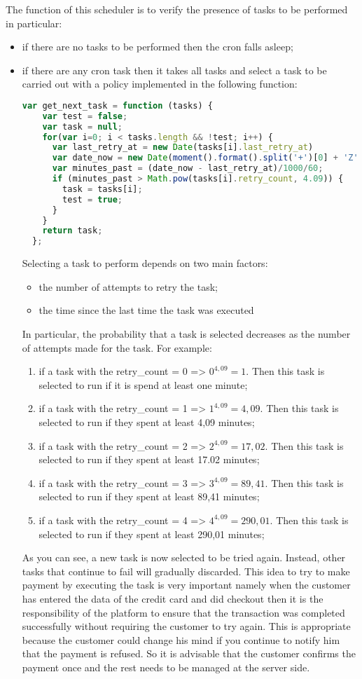 The function of this scheduler is to verify the presence of tasks to be performed in particular:
\begin{itemize}
\item if there are no tasks to be performed then the cron falls asleep;
\item if there are any cron task then it takes all tasks and select a task to be carried out with a policy implemented in the following function:
\begin{lstlisting}[language=javascript]
  var get_next_task = function (tasks) {
    var test = false;
    var task = null;
    for(var i=0; i < tasks.length && !test; i++) {
      var last_retry_at = new Date(tasks[i].last_retry_at)
      var date_now = new Date(moment().format().split('+')[0] + 'Z');
      var minutes_past = (date_now - last_retry_at)/1000/60;
      if (minutes_past > Math.pow(tasks[i].retry_count, 4.09)) {
        task = tasks[i];
        test = true;
      }
    }
    return task;
  };
\end{lstlisting}
Selecting a task to perform depends on two main factors:\begin{itemize}
\item the number of attempts to retry the task;
\item the time since the last time the task was executed
\end{itemize}
In particular, the probability that a task is selected decreases as the number of attempts made for the task.
For example:
\begin{enumerate}
\item if a task with the retry\_count = 0 => \(0^{4,09} = 1\). Then this task is selected to run if it is spend at least one minute;
\item if a task with the retry\_count = 1 => \(1^{4,09} = 4,09\). Then this task is selected to run if they spent at least 4,09 minutes;
\item if a task with the retry\_count = 2 => \(2^{4,09} = 17,02\). Then this task is selected to run if they spent at least 17.02 minutes;
\item if a task with the retry\_count = 3 => \(3^{4,09} = 89,41\). Then this task is selected to run if they spent at least 89,41 minutes;
\item if a task with the retry\_count = 4 => \(4^{4,09} = 290,01\). Then this task is selected to run if they spent at least 290,01 minutes;
\end{enumerate}
As you can see, a new task is now selected to be tried again. Instead, other tasks that continue to fail will gradually discarded.
\newline
This idea to try to make payment by executing the task is very important namely when the customer has entered the data of the credit card and did checkout then it is the responsibility of the platform to ensure that the transaction was completed successfully without requiring the customer to try again.
\newline
This is appropriate because the customer could change his mind if you continue to notify him that the payment is refused. So it is advisable that the customer confirms the payment once and the rest needs to be managed at the server side.
\end{itemize}